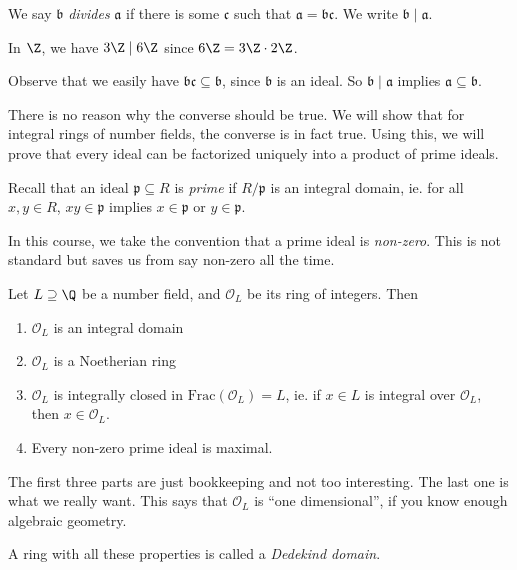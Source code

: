 \documentclass[a4paper]{article}
\begin{document}
\begin{defi}[Divisibility]
  We say $\mathfrak{b}$ \emph{divides} $\mathfrak{a}$ if there is some $\mathfrak{c}$ such that $\mathfrak{a} = \mathfrak{b}\mathfrak{c}$. We write $\mathfrak{b} \mid \mathfrak{a}$.
\end{defi}

\begin{eg}
  In $\Z$, we have $3\Z \mid 6\Z$ since $6\Z = 3\Z \cdot 2\Z$.
\end{eg}

Observe that we easily have $\mathfrak{b} \mathfrak{c} \subseteq \mathfrak{b}$, since $\mathfrak{b}$ is an ideal. So $\mathfrak{b} \mid \mathfrak{a}$ implies $\mathfrak{a} \subseteq \mathfrak{b}$.

There is no reason why the converse should be true. We will show that for integral rings of number fields, the converse is in fact true. Using this, we will prove that every ideal can be factorized uniquely into a product of prime ideals.

Recall that an ideal $\mathfrak{p} \subseteq R$ is \emph{prime} if $R/\mathfrak{p}$ is an integral domain, ie. for all $x, y \in R$, $xy \in \mathfrak{p}$ implies $x \in \mathfrak{p}$ or $y \in \mathfrak{p}$.

In this course, we take the convention that a prime ideal is \emph{non-zero}. This is not standard but saves us from say non-zero all the time.

\begin{prop}
  Let $L \supseteq \Q$ be a number field, and $\mathcal{O}_L$ be its ring of integers. Then
  \begin{enumerate}
    \item $\mathcal{O}_L$ is an integral domain
    \item $\mathcal{O}_L$ is a Noetherian ring
    \item $\mathcal{O}_L$ is integrally closed in $\mathrm{Frac}(\mathcal{O}_L) = L$, ie. if $x \in L$ is integral over $\mathcal{O}_L$, then $x \in \mathcal{O}_L$.
    \item Every non-zero prime ideal is maximal.
  \end{enumerate}
\end{prop}
The first three parts are just bookkeeping and not too interesting. The last one is what we really want. This says that $\mathcal{O}_L$ is ``one dimensional'', if you know enough algebraic geometry.

A ring with all these properties is called a \emph{Dedekind domain}.
\end{document}
